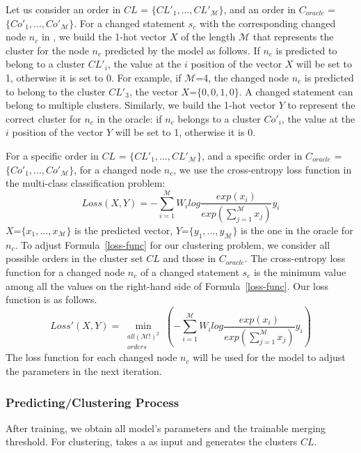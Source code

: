 Let us consider an order in $CL$ = $\{CL'_1,..., CL'_{\mathcal{M}}\}$,
and an order in $C_{oracle}$ = $\{Co'_{1},..., Co'_{\mathcal{M}}\}$.
For a changed statement $s_c$ with the corresponding changed node
$n_c$ in {\mvpdg}, we build the 1-hot vector $X$ of the length
$\mathcal{M}$ that represents the cluster for the node $n_c$
predicted by the model as follows. If $n_c$ is predicted to belong to
a cluster $CL'_{i}$, the value at the $i$ position of the vector $X$
will be set to 1, otherwise it is set to 0. For example, if
$\mathcal{M}$=4, the changed node $n_c$ is predicted to belong to the
cluster $CL'_3$, the vector $X$=$\{0,0,1,0\}$. A changed statement can
belong to multiple clusters. Similarly, we build the 1-hot vector $Y$
to represent the correct cluster for $n_c$ in the oracle: if $n_c$
belongs to a cluster $Co'_{i}$, the value at the $i$ position of the
vector $Y$ will be set to 1, otherwise it is 0.

For a specific order in $CL$ = $\{CL'_1,..., CL'_{\mathcal{M}}\}$, and
a specific order in $C_{oracle}$ = $\{Co'_{1},...,
Co'_{\mathcal{M}}\}$, for a changed node $n_c$, we use the
cross-entropy loss function in the multi-class classification problem:
\begin{equation}\label{loss-func}
	Loss(X,Y) = -\sum^{\mathcal{M}}_{i=1}W_ilog\frac{exp(x_i)}{exp(\sum^{\mathcal{M}}_{j=1}x_j)}y_i
\end{equation}
$X$=$\{x_1,...,x_{\mathcal{M}}\}$ is the predicted vector,
$Y$=$\{y_1,...,y_{\mathcal{M}}\}$ is the one in the oracle for $n_c$. To
adjust Formula~\ref{loss-func} for our clustering problem, we
consider all possible orders in the cluster set $CL$ and those in
$C_{oracle}$. The cross-entropy loss function for a changed node
$n_c$ of a changed statement $s_c$ is the minimum value among all the
values on the right-hand side of Formula~\ref{loss-func}. Our
loss function is as follows.
\begin{equation}\label{eq6}
	Loss'(X, Y)= \min\limits_{\substack{all (\mathcal{M}!)^{2}\\orders}}(-\sum^{\mathcal{M}}_{i=1}W_ilog\frac{exp(x_i)}{exp(\sum^{\mathcal{M}}_{j=1}x_j)}y_i)
\end{equation}
The loss function for each changed node $n_c$ will be used for
the model to adjust the parameters in the next iteration.


\subsubsection*{Predicting/Clustering Process}
After training, we obtain all model's parameters and the trainable
merging threshold. For clustering, {\tool} takes a {\mvpdg} as input
and generates the clusters $CL$.
